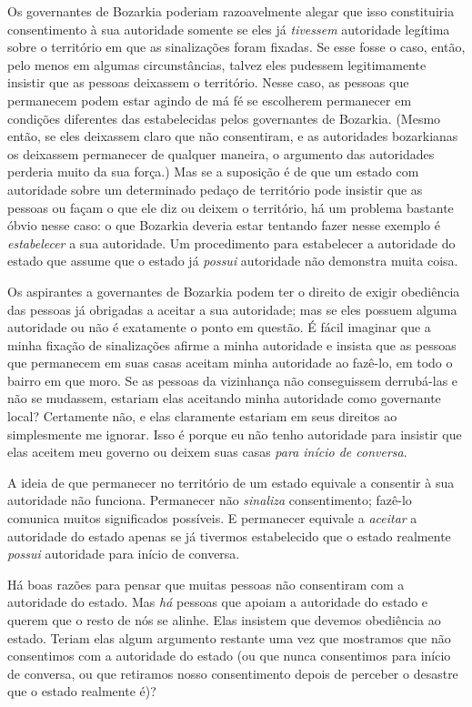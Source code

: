 Os governantes de Bozarkia poderiam razoavelmente alegar que isso constituiria consentimento à sua autoridade somente se eles já \emph{tivessem} autoridade legítima sobre o território em que as sinalizações foram fixadas. Se esse fosse o caso, então, pelo menos em algumas circunstâncias, talvez eles pudessem legitimamente insistir que as pessoas deixassem o território. Nesse caso, as pessoas que permanecem podem estar agindo de má fé se escolherem permanecer em condições diferentes das estabelecidas pelos governantes de Bozarkia. (Mesmo então, se eles deixassem claro que não consentiram, e as autoridades bozarkianas os deixassem permanecer de qualquer maneira, o argumento das autoridades perderia muito da sua força.) Mas se a suposição é de que um estado com autoridade sobre um determinado pedaço de território pode insistir que as pessoas ou façam o que ele diz ou deixem o território, há um problema bastante óbvio nesse caso: o que Bozarkia deveria estar tentando fazer nesse exemplo é \emph{estabelecer} a sua autoridade. Um procedimento para estabelecer a autoridade do estado que assume que o estado já \emph{possui} autoridade não demonstra muita coisa.

Os aspirantes a governantes de Bozarkia podem ter o direito de exigir obediência das pessoas já obrigadas a aceitar a sua autoridade; mas se eles possuem alguma autoridade ou não é exatamente o ponto em questão. É fácil imaginar que a minha fixação de sinalizações afirme a minha autoridade e insista que as pessoas que permanecem em suas casas aceitam minha autoridade ao fazê-lo, em todo o bairro em que moro. Se as pessoas da vizinhança não conseguissem derrubá-las e não se mudassem, estariam elas aceitando minha autoridade como governante local? Certamente não, e elas claramente estariam em seus direitos ao simplesmente me ignorar. Isso é porque eu não tenho autoridade para insistir que elas aceitem meu governo ou deixem suas casas \emph{para início de conversa}.

A ideia de que permanecer no território de um estado equivale a consentir à sua autoridade não funciona. Permanecer não \emph{sinaliza} consentimento; fazê-lo comunica muitos significados possíveis. E permanecer equivale a \emph{aceitar} a autoridade do estado apenas se já tivermos estabelecido que o estado realmente \emph{possui} autoridade para início de conversa.

Há boas razões para pensar que muitas pessoas não consentiram com a autoridade do estado. Mas \emph{há} pessoas que apoiam a autoridade do estado e querem que o resto de nós se alinhe. Elas insistem que devemos obediência ao estado. Teriam elas algum argumento restante uma vez que mostramos que não consentimos com a autoridade do estado (ou que nunca consentimos para início de conversa, ou que retiramos nosso consentimento depois de perceber o desastre que o estado realmente é)?


